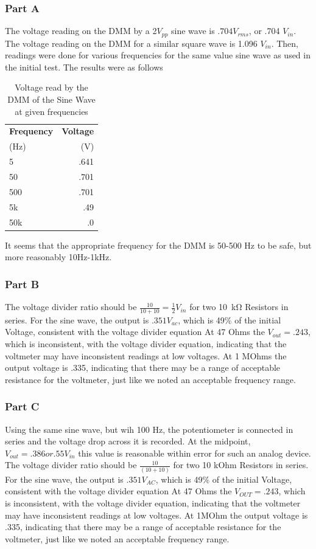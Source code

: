 \documentclass[10pt]{article}
\begin{document}
\subsubsection{Part A}

	 The voltage reading on the DMM by a 2$V_{pp}$ sine wave is $.704 V_{rms}$, or .704 $V_{in}$. The voltage reading on the DMM for a similar square wave is 1.096 $V_{in}$. Then, readings were done for various frequencies for the same value sine wave as used in the initial test. The results were as follows
	\begin{table}[H]
		\begin{center}
			\caption{Voltage read by the DMM of the Sine Wave at given frequencies}
			\label{tab: 31A}
			\begin{tabular}{l|r}
				\textbf{Frequency} & \textbf{Voltage}\\
				(Hz) & (V)\\
				\hline
				5 & .641\\
				50 & .701\\
				500 & .701\\
				5k & .49\\
				50k & .0\\
			\end{tabular}
		\end{center}
	\end{table}
	It seems that the appropriate frequency for the DMM is 50-500 Hz to be safe, but more reasonably 10Hz-1kHz.
\subsubsection{Part B}
	 The voltage divider ratio should be $\frac{10}{10+10} = \frac{1}{2} V_{in}$  for two \SI{10}{\kilo\ohm} Resistors in series. For the sine wave, the output is $.351 V_{ac}$, which is 49\% of the initial Voltage, consistent with the voltage divider equation 
	 At 47 Ohms the $V_{out} = .243$, which is inconsistent, with the voltage divider equation, indicating that the voltmeter may have inconsistent readings at low voltages. 
	 At 1 MOhms the output voltage is .335, indicating that there may be a range of acceptable resistance for the voltmeter, just like we noted an acceptable frequency range.
\subsubsection{Part C} 
	Using the same sine wave, but wih 100 Hz, the potentiometer is connected in series and the voltage drop across it is recorded. At the midpoint, $V_{out} = .386 or .55 V_{in}$ this value is reasonable within error for such an analog device. 
	 The voltage divider ratio should be $\frac{10}{(10+10)}$  for two 10 kOhm Resistors in series. For the sine wave, the output is $.351 V_{AC}$, which is 49\% of the initial Voltage, consistent with the voltage divider equation 
	 At 47 Ohms the $V_{OUT} = .243$, which is inconsistent, with the voltage divider equation, indicating that the voltmeter may have inconsistent readings at low voltages. 
	 At 1MOhm the output voltage is .335, indicating that there may be a range of acceptable resistance for the voltmeter, just like we noted an acceptable frequency range.
\end{document}
